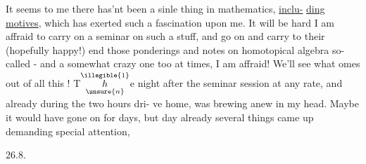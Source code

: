 
It seems to me there has'nt been a sinle thing in mathematics,  \uline{inclu-}%
\uline{ding motives},  which has exerted such a fascination upon me.  It will be 
hard I am affraid to carry on a seminar on such a stuff,  and go on and
carry to their (hopefully happy!) end those ponderings and notes on
homotopical algebra so-called  -  and a somewhat crazy one too at times,
I am affraid!  We'll see what omes out of all this !  T$\overset{\illegible{1}}{\underset{\unsure{n}}{h}}$e night after
the seminar session at any rate,  and already during the two hours dri-%
ve home,     was brewing anew in my head.  Maybe it
would have gone on for days,  but   day already several things came \margin{$\sim$}
up demanding special attention,

26.8.

